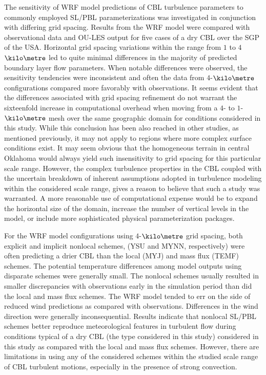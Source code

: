 The sensitivity of WRF model predictions of CBL turbulence parameters to commonly employed SL\slash PBL parameterizations was investigated in conjunction with differing grid spacing. Results from the WRF model were compared with observational data and OU-LES output for five cases of a dry CBL over the SGP of the USA. Horizontal grid spacing variations within the range from $1$ to $4$ $\kilo\metre$ led to quite minimal differences in the majority of predicted boundary layer flow parameters. When notable differences were observed, the sensitivity tendencies were inconsistent and often the data from $4$-$\kilo\metre$ configurations compared more favorably with observations. It seems evident that the differences associated with grid spacing refinement do not warrant the sixteenfold increase in computational overhead when moving from a $4$- to $1$- $\kilo\metre$ mesh over the same geographic domain for conditions considered in this study. While this conclusion has been also reached in other studies, as mentioned previously, it may not apply to regions where more complex surface conditions exist. It may seem obvious that the homogeneous terrain in central Oklahoma would always yield such insensitivity to grid spacing for this particular scale range. However, the complex turbulence properties in the CBL coupled with the uncertain breakdown of inherent assumptions adopted in turbulence modeling within the considered scale range, gives a reason to believe that such a study was warranted. A more reasonable use of computational expense would be to expand the horizontal size of the domain, increase the number of vertical levels in the model, or include more sophisticated physical parameterization packages.

For the WRF model configurations using $4$-$\kilo\metre$ grid spacing, both explicit and implicit nonlocal schemes, (YSU and MYNN, respectively) were often predicting a drier CBL than the local (MYJ) and mass flux (TEMF) schemes. The potential temperature differences among model outputs using disparate schemes were generally small. The nonlocal schemes usually resulted in smaller discrepancies with observations early in the simulation period than did the local and mass flux schemes. The WRF model tended to err on the side of reduced wind predictions as compared with observations. Differences in the wind direction were generally inconsequential. Results indicate that nonlocal SL\slash PBL schemes better reproduce meteorological features in turbulent flow during conditions typical of a dry CBL (the type considered in this study) considered in this study as compared with the local and mass flux schemes. However, there are limitations in using any of the considered schemes within the studied scale range of CBL turbulent motions, especially in the presence of strong convection.

